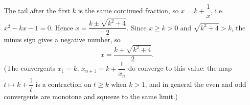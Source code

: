 The tail after the first $k$ is the same continued fraction, so $x=k+\dfrac1x$, i.e. $x^2-kx-1=0$. Hence $x=\dfrac{k\pm\sqrt{k^2+4}}{2}$. Since $x\ge k>0$ and $\sqrt{k^2+4}>k$, the minus sign gives a negative number, so
\[x=\boxed{\dfrac{k+\sqrt{k^2+4}}{2}}.\]
(The convergents $x_1=k$, $x_{n+1}=k+\dfrac1{x_n}$ do converge to this value: the map $t\mapsto k+\dfrac1t$ is a contraction on $t\ge k$ when $k>1$, and in general the even and odd convergents are monotone and squeeze to the same limit.)
